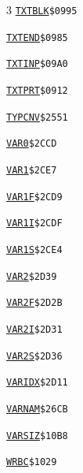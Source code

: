 \begin{multicols}{3}
\noindent\hyperlink{l:TXTBLK}{\texttt{TXTBLK}}\hfill\texttt{\$0995~\phantom{000}\llap{\pageref{l:TXTBLK}}}\par
\noindent\hyperlink{l:TXTEND}{\texttt{TXTEND}}\hfill\texttt{\$0985~\phantom{000}\llap{\pageref{l:TXTEND}}}\par
\noindent\hyperlink{l:TXTINP}{\texttt{TXTINP}}\hfill\texttt{\$09A0~\phantom{000}\llap{\pageref{l:TXTINP}}}\par
\noindent\hyperlink{l:TXTPRT}{\texttt{TXTPRT}}\hfill\texttt{\$0912~\phantom{000}\llap{\pageref{l:TXTPRT}}}\par
\noindent\hyperlink{l:TYPCNV}{\texttt{TYPCNV}}\hfill\texttt{\$2551~\phantom{000}\llap{\pageref{l:TYPCNV}}}\par
\noindent\hyperlink{l:VAR0}{\texttt{VAR0}}\hfill\texttt{\$2CCD~\phantom{000}\llap{\pageref{l:VAR0}}}\par
\noindent\hyperlink{l:VAR1}{\texttt{VAR1}}\hfill\texttt{\$2CE7~\phantom{000}\llap{\pageref{l:VAR1}}}\par
\noindent\hyperlink{l:VAR1F}{\texttt{VAR1F}}\hfill\texttt{\$2CD9~\phantom{000}\llap{\pageref{l:VAR1F}}}\par
\noindent\hyperlink{l:VAR1I}{\texttt{VAR1I}}\hfill\texttt{\$2CDF~\phantom{000}\llap{\pageref{l:VAR1I}}}\par
\noindent\hyperlink{l:VAR1S}{\texttt{VAR1S}}\hfill\texttt{\$2CE4~\phantom{000}\llap{\pageref{l:VAR1S}}}\par
\noindent\hyperlink{l:VAR2}{\texttt{VAR2}}\hfill\texttt{\$2D39~\phantom{000}\llap{\pageref{l:VAR2}}}\par
\noindent\hyperlink{l:VAR2F}{\texttt{VAR2F}}\hfill\texttt{\$2D2B~\phantom{000}\llap{\pageref{l:VAR2F}}}\par
\noindent\hyperlink{l:VAR2I}{\texttt{VAR2I}}\hfill\texttt{\$2D31~\phantom{000}\llap{\pageref{l:VAR2I}}}\par
\noindent\hyperlink{l:VAR2S}{\texttt{VAR2S}}\hfill\texttt{\$2D36~\phantom{000}\llap{\pageref{l:VAR2S}}}\par
\noindent\hyperlink{l:VARIDX}{\texttt{VARIDX}}\hfill\texttt{\$2D11~\phantom{000}\llap{\pageref{l:VARIDX}}}\par
\noindent\hyperlink{l:VARNAM}{\texttt{VARNAM}}\hfill\texttt{\$26CB~\phantom{000}\llap{\pageref{l:VARNAM}}}\par
\noindent\hyperlink{l:VARSIZ}{\texttt{VARSIZ}}\hfill\texttt{\$10B8~\phantom{000}\llap{\pageref{l:VARSIZ}}}\par
\noindent\hyperlink{l:WRBC}{\texttt{WRBC}}\hfill\texttt{\$1029~\phantom{000}\llap{\pageref{l:WRBC}}}\par

\end{multicols}
